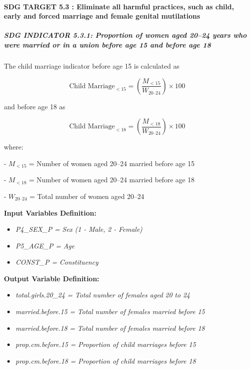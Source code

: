 \documentclass[
]{article}
\begin{document}
\paragraph{SDG TARGET 5.3 : Eliminate all harmful practices, such as
child, early and forced marriage and female genital
mutilations}\label{sdg-target-5.3-eliminate-all-harmful-practices-such-as-child-early-and-forced-marriage-and-female-genital-mutilations}

\subparagraph{\texorpdfstring{\textbf{SDG INDICATOR 5.3.1: Proportion of
women aged 20--24 years who were married or in a union before age 15 and
before age
18}}{SDG INDICATOR 5.3.1: Proportion of women aged 20--24 years who were married or in a union before age 15 and before age 18}}\label{sdg-indicator-5.3.1-proportion-of-women-aged-2024-years-who-were-married-or-in-a-union-before-age-15-and-before-age-18}

The child marriage indicator before age 15 is calculated as

\[
\text{Child Marriage}_{<15} = \left( \frac{M_{<15}}{W_{20\text{--}24}} \right) \times 100
\]

and before age 18 as

\[
\text{Child Marriage}_{<18} = \left( \frac{M_{<18}}{W_{20\text{--}24}} \right) \times 100
\]

where:

- \(M_{<15}\) = Number of women aged 20--24 married before age 15

- \(M_{<18}\) = Number of women aged 20--24 married before age 18

- \(W_{20\text{--}24}\) = Total number of women aged 20--24

\textbf{Input Variables Definition:}

\begin{itemize}
\item
  \emph{P4\_SEX\_P = Sex (1 - Male, 2 - Female)}
\item
  \emph{P5\_AGE\_P = Age}
\item
  \emph{CONST\_P = Constituency}
\end{itemize}

\textbf{Output Variable Definition:}

\begin{itemize}
\item
  \emph{total.girls.20\_24 = Total number of females aged 20 to 24}
\item
  \emph{married.before.15 = Total number of females married before 15}
\item
  \emph{married.before.18 = Total number of females married before 18}
\item
  \emph{prop.cm.before.15 = Proportion of child marriages before 15}
\item
  \emph{prop.cm.before.18 = Proportion of child marriages before 18}
\end{itemize}
\end{document}
